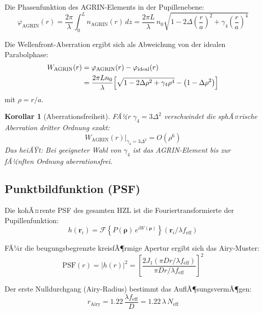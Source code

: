 ﻿\documentclass[12pt,a4paper]{article}
\newtheorem{korollar}[theorem]{Korollar}
\theoremstyle{definition}
\newcommand{\eff}{\mathrm{eff}}
\newcommand{\AGRIN}{\mathrm{AGRIN}}
\newcommand{\PSF}{\mathrm{PSF}}
\renewcommand{\abs}[1]{\left|#1\right|}
\begin{document}
	Die Phasenfunktion des AGRIN-Elements in der Pupillenebene:
	\begin{equation}
		\varphi_\AGRIN(r) = \frac{2\pi}{\lambda}\int_0^L n_\AGRIN(r)\,dz
		= \frac{2\pi L}{\lambda}\,n_0\sqrt{1 - 2\Delta\!\left(\frac{r}{a}\right)^{\!2}
			+ \gamma_4\!\left(\frac{r}{a}\right)^{\!4}}
		\label{eq:phase_agrin}
	\end{equation}
	
	Die Wellenfront-Aberration ergibt sich als Abweichung von der idealen Parabolphase:
	\begin{align}
		W_\AGRIN(r) &= \varphi_\AGRIN(r) - \varphi_\mathrm{ideal}(r) \notag\\
		&= \frac{2\pi L n_0}{\lambda}\!\left[
		\sqrt{1 - 2\Delta\rho^2 + \gamma_4\rho^4}
		- \left(1 - \Delta\rho^2\right)\right]
		\label{eq:wavefront}
	\end{align}
	mit $\rho = r/a$.
	
	\begin{korollar}[Aberrationsfreiheit]
		FÃ¼r $\gamma_4 = 3\Delta^2$ verschwindet die sphÃ¤rische Aberration dritter
		Ordnung exakt:
		\begin{equation}
			W_\AGRIN(r)\big|_{\gamma_4 = 3\Delta^2}
			= O\!\left(\rho^6\right)
		\end{equation}
		Das heiÃŸt: Bei geeigneter Wahl von $\gamma_4$ ist das AGRIN-Element
		bis zur fÃ¼nften Ordnung aberrationsfrei.
	\end{korollar}
	
	\subsection{Punktbildfunktion (PSF)}
	
	Die kohÃ¤rente PSF des gesamten HZL ist die Fouriertransformierte der
	Pupillenfunktion:
	\begin{equation}
		h(\mathbf{r}_i) = \mathcal{F}\!\left\{P(\boldsymbol{\rho})\,
		e^{i W(\boldsymbol{\rho})}\right\}(\mathbf{r}_i / \lambda f_\eff)
		\label{eq:psf_coherent}
	\end{equation}
	
	FÃ¼r die beugungsbegrenzte kreisfÃ¶rmige Apertur ergibt sich das Airy-Muster:
	\begin{equation}
		\PSF(r) = \abs{h(r)}^2
		= \left[\frac{2J_1\!\left(\pi D r / \lambda f_\eff\right)}
		{\pi D r / \lambda f_\eff}\right]^{\!2}
		\label{eq:airy}
	\end{equation}
	
	Der erste Nulldurchgang (Airy-Radius) bestimmt das AuflÃ¶sungsvermÃ¶gen:
	\begin{equation}
		r_\mathrm{Airy} = 1.22\,\frac{\lambda f_\eff}{D}
		= 1.22\,\lambda\,N_\eff
		\label{eq:airy_radius}
	\end{equation}
	
\end{document}
